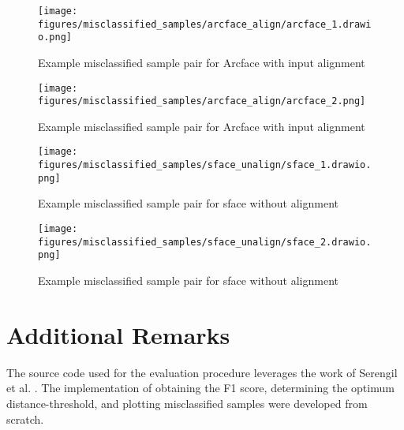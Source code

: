 \documentclass[10pt,a4paper,twoside]{article}
\begin{document}
\begin{figure}[h]
    \centering
    \texttt{[image: figures/misclassified\_samples/arcface\_align/arcface\_1.drawio.png]} 
    \caption{Example misclassified sample pair for Arcface with input alignment}
    \label{fig:miss_arc_1}
\end{figure}

\begin{figure}[h]
    \centering
    \texttt{[image: figures/misclassified\_samples/arcface\_align/arcface\_2.png]} 
    \caption{Example misclassified sample pair for Arcface with input alignment}
    \label{fig:miss_arc_2}
\end{figure}

\begin{figure}[h]
    \centering
    \texttt{[image: figures/misclassified\_samples/sface\_unalign/sface\_1.drawio.png]} 
    \caption{Example misclassified sample pair for sface without alignment}
    \label{fig:miss_sf_1}
\end{figure}

\begin{figure}[h]
    \centering
    \texttt{[image: figures/misclassified\_samples/sface\_unalign/sface\_2.drawio.png]} 
    \caption{Example misclassified sample pair for sface without alignment}
    \label{fig:miss_sf_2}
\end{figure}


\section{Additional Remarks}
The source code used for the evaluation procedure leverages the work of Serengil et al. \cite{deepface}. The implementation of obtaining the F1 score, determining the optimum distance-threshold, and plotting misclassified samples were developed from scratch.




\end{document}
